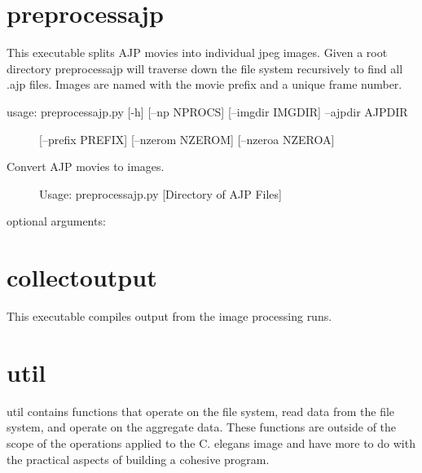 \documentclass[letterpaper,10pt,oneside]{sphinxmanual}
\begin{document}
\chapter{preprocessajp}
\label{index:preprocessajp}
This executable splits AJP movies into individual jpeg images.  Given a root
directory preprocessajp will traverse down the file system recursively to find
all .ajp files.  Images are named with the movie prefix and a unique frame 
number.
\begin{description}
\item[{usage: preprocessajp.py {[}-h{]} {[}--np NPROCS{]} {[}--imgdir IMGDIR{]} --ajpdir AJPDIR}] \leavevmode
{[}--prefix PREFIX{]} {[}--nzerom NZEROM{]} {[}--nzeroa NZEROA{]}

\item[{Convert AJP movies to images. }] \leavevmode
Usage: preprocessajp.py {[}Directory of AJP Files{]}

\item[{optional arguments:}] \leavevmode{}

\end{description}
\label{index:module-collectoutput}

\chapter{collectoutput}
\label{index:collectoutput}
This executable compiles output from the image processing runs.
\label{index:module-libutil}

\chapter{util}
\label{index:util}
util contains functions that operate on the file system, read data
from the file system, and operate on the aggregate data.  These
functions are outside of the scope of the operations applied to the 
C. elegans image and have more to do with the practical aspects of 
building a cohesive program.
\end{document}
